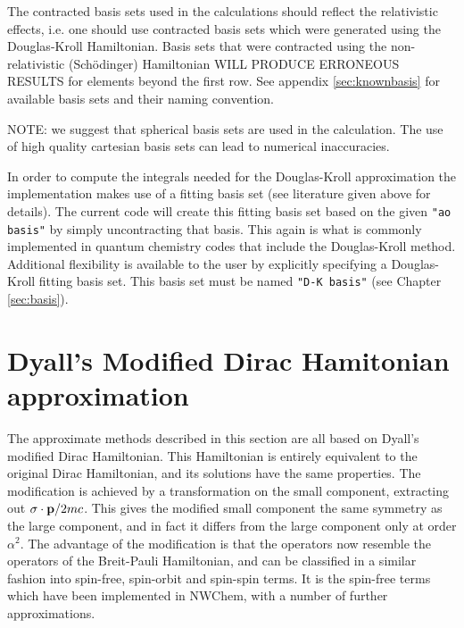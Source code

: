 The contracted basis sets used in the calculations should reflect the relativistic
effects, i.e. one should use contracted basis sets which were generated using the 
Douglas-Kroll Hamiltonian. Basis sets that were contracted using the 
non-relativistic (Sch\"{o}dinger) Hamiltonian WILL PRODUCE ERRONEOUS RESULTS for
elements beyond the first row. See appendix \ref{sec:knownbasis} for available
basis sets and their naming convention.

NOTE: we suggest that spherical basis sets are used in the calculation. The use of 
high quality cartesian basis sets can lead to numerical inaccuracies.

In order to compute the integrals needed for the Douglas-Kroll approximation
the implementation makes use of a fitting basis set (see literature given
above for details). The current code will create this fitting basis set
based on the given {\tt "ao basis"} by simply uncontracting that basis. This
again is what is commonly implemented in quantum chemistry codes that
include the Douglas-Kroll method.  Additional flexibility is available to
the user by explicitly specifying a Douglas-Kroll fitting basis
set. This basis set must be named {\tt "D-K basis"} (see Chapter
\ref{sec:basis}).

\section{Dyall's Modified Dirac Hamitonian approximation}
\label{sec:dyall-mod-dir}


The approximate methods described in this section are all based on Dyall's
modified Dirac Hamiltonian. This Hamiltonian is entirely equivalent to the
original Dirac Hamiltonian, and its solutions have the same properties.
The modification is achieved by a transformation on the small component,
extracting out \hbox{$\sigma\cdot{\bf p}/2mc$}. This gives the modified small
component the same symmetry as the large component, and in fact it differs
from the large component only at order $\alpha^2$.  The advantage of the
modification is that the operators now resemble the operators of the
Breit-Pauli Hamiltonian, and can be classified in a similar fashion into
spin-free, spin-orbit and spin-spin terms. It is the spin-free terms which
have been implemented in NWChem, with a number of further approximations.

